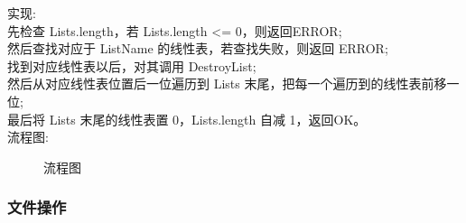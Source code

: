 \documentclass[supercite]{Experimental_Report}
\theoremstyle{definition}
\begin{document}
\noindent
实现: \\
先检查 Lists.length，若 Lists.length <= 0，则返回ERROR; \\
然后查找对应于 ListName 的线性表，若查找失败，则返回 ERROR; \\
找到对应线性表以后，对其调用 DestroyList; \\
然后从对应线性表位置后一位遍历到 Lists 末尾，把每一个遍历到的线性表前移一位; \\
最后将 Lists 末尾的线性表置 0，Lists.length 自减 1，返回OK。\\
流程图:
\begin{figure}[H]
	\centering
	\centering
	\caption{流程图}
	\label{fig6-6}
\end{figure}

\clearpage
\subsubsection{文件操作}
\end{document}
